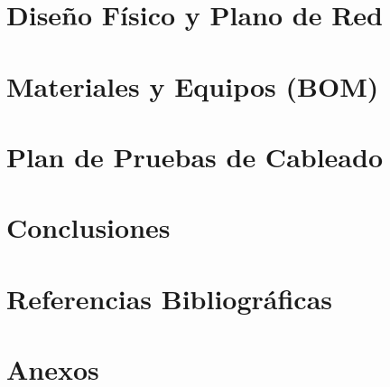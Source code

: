 \documentclass[12pt,a4paper]{article}
\begin{document}
\section{Diseño Físico y Plano de Red}

\section{Materiales y Equipos (BOM)}

\section{Plan de Pruebas de Cableado}

\section{Conclusiones}

\section{Referencias Bibliográficas}

\section{Anexos}
\end{document}

